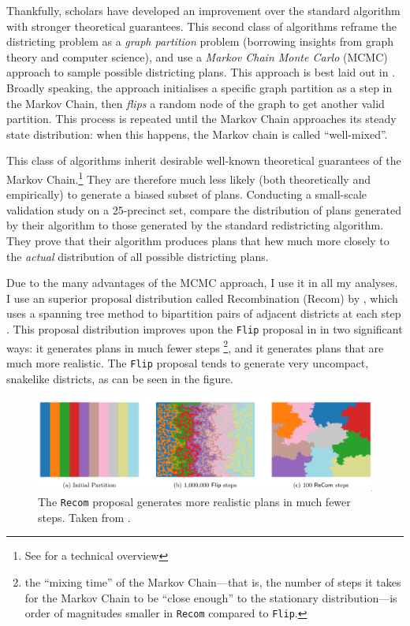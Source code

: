 \documentclass[]{article}
\begin{document}
Thankfully, scholars have developed an improvement over the standard
algorithm with stronger theoretical guarantees. This second class of
algorithms reframe the districting problem as a \emph{graph partition}
problem (borrowing insights from graph theory and computer science), and
use a \emph{Markov Chain Monte Carlo} (MCMC) approach to sample possible
districting plans. This approach is best laid out in \cite{fifieldwp}.
Broadly speaking, the approach initialises a specific graph partition as
a step in the Markov Chain, then \emph{flips} a random node of the graph
to get another valid partition. This process is repeated until the
Markov Chain approaches its steady state distribution: when this
happens, the Markov chain is called ``well-mixed''.

This class of algorithms inherit desirable well-known theoretical
guarantees of the Markov Chain.\footnote{See \cite{ddj2019recom} for a
  technical overview} They are therefore much less likely (both
theoretically and empirically) to generate a biased subset of plans.
Conducting a small-scale validation study on a 25-precinct set,
\citeauthor{fifieldwp} compare the distribution of plans generated by
their algorithm to those generated by the standard redistricting
algorithm. They prove that their algorithm produces plans that hew much
more closely to the \emph{actual} distribution of all possible
districting plans.

Due to the many advantages of the MCMC approach, I use it in all my
analyses. I use an superior proposal distribution called Recombination
(Recom) by \citeauthor{ddj2019recom}, which uses a spanning tree method
to bipartition pairs of adjacent districts at each step
\citep{ddj2019comp}. This proposal distribution improves upon the
\texttt{Flip} proposal in \citeauthor{fifieldwp} in two significant
ways: it generates plans in much fewer steps \footnote{the ``mixing
  time'' of the Markov Chain---that is, the number of steps it takes for
  the Markov Chain to be ``close enough'' to the stationary
  distribution---is order of magnitudes smaller in \texttt{Recom}
  compared to \texttt{Flip}.}, and it generates plans that are much more
realistic. The \texttt{Flip} proposal tends to generate very uncompact,
snakelike districts, as can be seen in the figure.

\begin{figure}
\centering
\includegraphics{img/recom_vs_flip.png}
\caption{The \texttt{Recom} proposal generates more realistic plans in
much fewer steps. Taken from \cite{ddj2019recom}.}
\end{figure}
\end{document}
